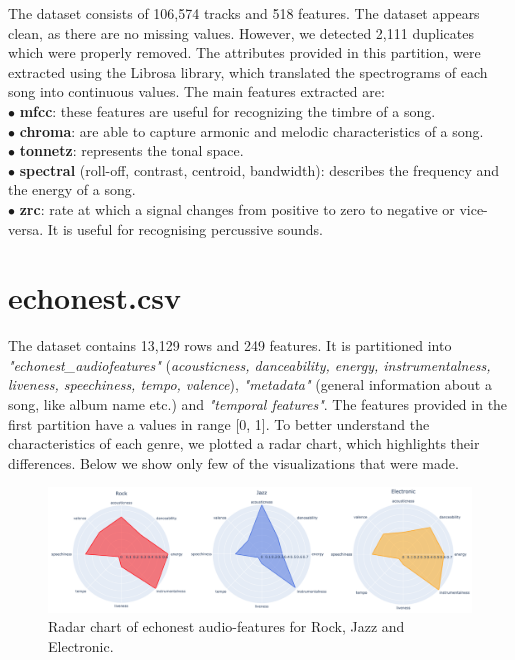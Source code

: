 The dataset consists of 106,574 tracks and 518 features. The dataset appears clean, as there are no missing values. However, we detected 2,111 duplicates which were properly removed.
The attributes provided in this partition, were extracted using the Librosa library, which translated the spectrograms of each song into continuous values.
The main features extracted are: \\
$\bullet$ \textbf{mfcc}: these features are useful for recognizing the timbre of a song.\\
$\bullet$ \textbf{chroma}: are able to capture armonic and melodic characteristics of a song. \\
$\bullet$ \textbf{tonnetz}: represents the tonal space.\\
$\bullet$ \textbf{spectral} (roll-off, contrast, centroid, bandwidth): describes the frequency and the energy of a song. \\
$\bullet$ \textbf{zrc}: rate at which a signal changes from positive to zero to negative or vice-versa. It is useful for recognising percussive sounds.\\

\section{echonest.csv}
The dataset contains 13,129 rows and 249 features. It is partitioned into \textit{"echonest\_audiofeatures"} (\textit{acousticness, danceability, energy, instrumentalness, liveness, speechiness, tempo, valence}), \textit{"metadata"} (general information about a song, like album name etc.) and \textit{"temporal features"}. 
The features provided in the first partition have a values in range [0, 1]. To better understand the characteristics of each genre, we plotted a radar chart, which highlights their differences. Below we show only few of the visualizations that were made. 
\begin{figure}[hp]
  \centering
  \includegraphics[width=0.85\linewidth]{images/radar-plot_Rock-Jazz-Electronic.png}
  \caption{Radar chart of echonest audio-features for Rock, Jazz and Electronic.}
\end{figure} 

